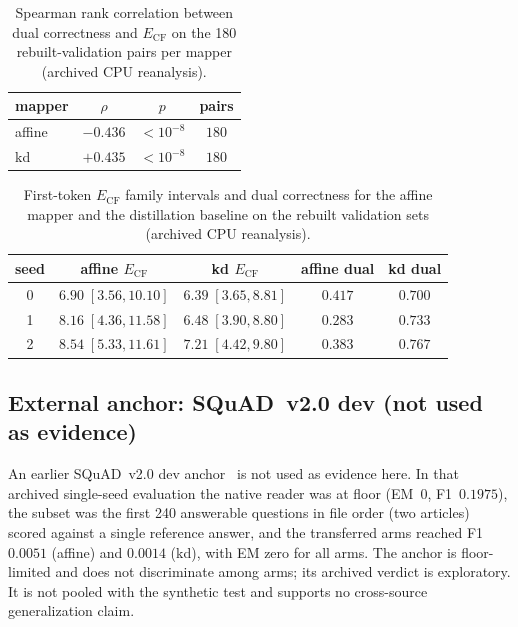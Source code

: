 \documentclass[11pt,twocolumn]{article}
\begin{document}
\begin{table}[t]
\centering
\caption{Spearman rank correlation between dual correctness and $E_{\mathrm{CF}}$
on the 180 rebuilt-validation pairs per mapper (archived CPU reanalysis).}
\label{tab:rank}
\begin{tabular}{lccc}
\toprule
mapper & $\rho$ & $p$ & pairs \\
\midrule
affine & $-0.436$ & $<10^{-8}$ & $180$ \\
kd & $+0.435$ & $<10^{-8}$ & $180$ \\
\bottomrule
\end{tabular}
\end{table}

\begin{table}[t]
\centering
\caption{First-token $E_{\mathrm{CF}}$ family intervals and dual correctness
for the affine mapper and the distillation baseline on the rebuilt validation
sets (archived CPU reanalysis).}
\label{tab:mappergap}
\begin{tabular}{ccccc}
\toprule
seed & affine $E_{\mathrm{CF}}$ & kd $E_{\mathrm{CF}}$ & affine dual & kd dual \\
\midrule
0 & $6.90\;[3.56,10.10]$ & $6.39\;[3.65,8.81]$ & $0.417$ & $0.700$ \\
1 & $8.16\;[4.36,11.58]$ & $6.48\;[3.90,8.80]$ & $0.283$ & $0.733$ \\
2 & $8.54\;[5.33,11.61]$ & $7.21\;[4.42,9.80]$ & $0.383$ & $0.767$ \\
\bottomrule
\end{tabular}
\end{table}

\subsection{External anchor: SQuAD~v2.0 dev (not used as evidence)}
\label{sec:anchor}

An earlier SQuAD~v2.0 dev anchor~\citep{squad16,squad18} is not used as
evidence here. In that archived single-seed evaluation the native reader was
at floor (EM~$0$, F1~$0.1975$), the subset was the first 240 answerable
questions in file order (two articles) scored against a single reference
answer, and the transferred arms reached F1~$0.0051$ (affine) and $0.0014$
(kd), with EM zero for all arms. The anchor is floor-limited and does not
discriminate among arms; its archived verdict is exploratory. It is not pooled
with the synthetic test and supports no cross-source generalization claim.
\end{document}
